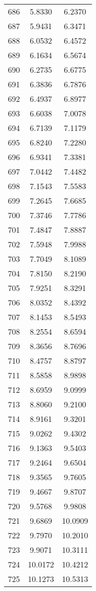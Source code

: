 \documentclass{article}
\begin{document}
\begin{longtable}{|c|c|c|}
686 & 5.8330 & 6.2370 \\
687 & 5.9431 & 6.3471 \\
688 & 6.0532 & 6.4572 \\
689 & 6.1634 & 6.5674 \\
690 & 6.2735 & 6.6775 \\
691 & 6.3836 & 6.7876 \\
692 & 6.4937 & 6.8977 \\
693 & 6.6038 & 7.0078 \\
694 & 6.7139 & 7.1179 \\
695 & 6.8240 & 7.2280 \\
696 & 6.9341 & 7.3381 \\
697 & 7.0442 & 7.4482 \\
698 & 7.1543 & 7.5583 \\
699 & 7.2645 & 7.6685 \\
700 & 7.3746 & 7.7786 \\
701 & 7.4847 & 7.8887 \\
702 & 7.5948 & 7.9988 \\
703 & 7.7049 & 8.1089 \\
704 & 7.8150 & 8.2190 \\
705 & 7.9251 & 8.3291 \\
706 & 8.0352 & 8.4392 \\
707 & 8.1453 & 8.5493 \\
708 & 8.2554 & 8.6594 \\
709 & 8.3656 & 8.7696 \\
710 & 8.4757 & 8.8797 \\
711 & 8.5858 & 8.9898 \\
712 & 8.6959 & 9.0999 \\
713 & 8.8060 & 9.2100 \\
714 & 8.9161 & 9.3201 \\
715 & 9.0262 & 9.4302 \\
716 & 9.1363 & 9.5403 \\
717 & 9.2464 & 9.6504 \\
718 & 9.3565 & 9.7605 \\
719 & 9.4667 & 9.8707 \\
720 & 9.5768 & 9.9808 \\
721 & 9.6869 & 10.0909 \\
722 & 9.7970 & 10.2010 \\
723 & 9.9071 & 10.3111 \\
724 & 10.0172 & 10.4212 \\
725 & 10.1273 & 10.5313 \\

\end{longtable}
\end{document}
